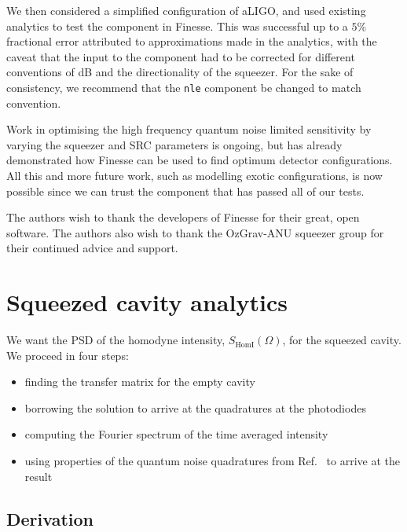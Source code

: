 \documentclass[aps,pra,superscriptaddress,reprint,nofootinbib]{revtex4-1}
\newcommand{\code}[1]{\texttt{#1}}
\begin{document}
We then considered a simplified configuration of aLIGO, and used existing analytics to test the component in Finesse. This was successful up to a $5\%$ fractional error attributed to approximations made in the analytics, with the caveat that the input to the component had to be corrected for different conventions of dB and the directionality of the squeezer.
For the sake of consistency, we recommend that the \code{nle} component be changed to match convention.


Work in optimising the high frequency quantum noise limited sensitivity by varying the squeezer and SRC parameters is ongoing, but has already demonstrated how Finesse can be used to find optimum detector configurations. All this and more future work, such as modelling  exotic configurations, is now possible since we can trust the component that has passed all of our tests.


\begin{acknowledgments}
The authors wish to thank the developers of Finesse for their great, open software.
The authors also wish to thank the OzGrav-ANU squeezer group for their continued advice and support.

\end{acknowledgments}


\appendix
\section{Squeezed cavity analytics}
\label{app:squeezed_cavity_analytics}

We want the PSD of the homodyne intensity, $S_{\mathrm{HomI}}(\Omega)$, for the squeezed cavity. We proceed in four steps:
\begin{itemize}
\item finding the transfer matrix for the empty cavity
\item borrowing the solution to arrive at the quadratures at the photodiodes
\item computing the Fourier spectrum of the time averaged intensity
\item using properties of the quantum noise quadratures from Ref.~\cite{Danilishin_2012} to arrive at the result
\end{itemize}

\subsection{Derivation}
\end{document}
